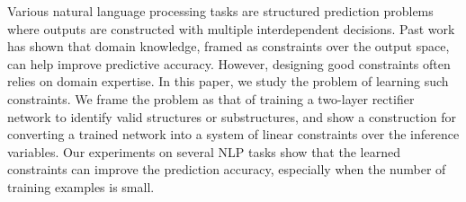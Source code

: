 Various natural language processing tasks are structured prediction problems where outputs are constructed with multiple interdependent decisions. Past work has shown that domain knowledge, framed as constraints over the output space, can help improve predictive accuracy. However, designing good constraints often relies on domain expertise. In this paper, we study the problem of learning such constraints. We frame the problem as that of training a two-layer rectifier network to identify valid structures or substructures, and show a construction for converting a trained network into a system of linear constraints over the inference variables. Our experiments on several NLP tasks show that the learned constraints can improve the prediction accuracy, especially when the number of training examples is small.
